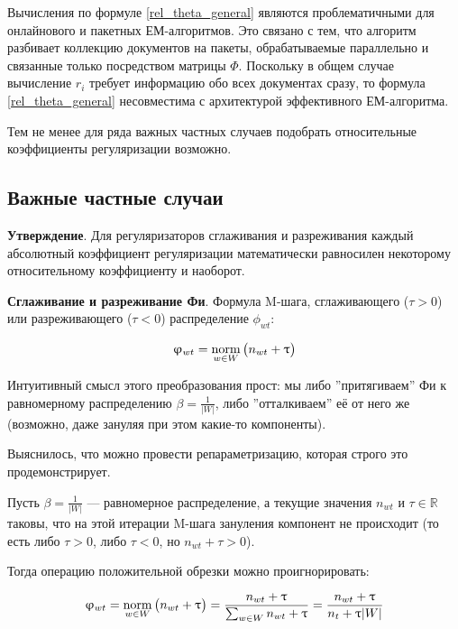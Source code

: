 Вычисления по формуле \ref{rel_theta_general} являются проблематичными для онлайнового и пакетных ЕМ-алгоритмов. Это связано с тем, что алгоритм разбивает коллекцию документов на пакеты, обрабатываемые параллельно и связанные только посредством матрицы $\Phi$. Поскольку в общем случае вычисление $r_i$ требует информацию обо всех документах сразу, то формула \ref{rel_theta_general} несовместима с архитектурой эффективного ЕМ-алгоритма.  

Тем не менее для ряда важных частных случаев подобрать относительные коэффициенты регуляризации возможно.  

\subsection{Важные частные случаи} 


\textbf{Утверждение}. Для регуляризаторов сглаживания и разреживания каждый абсолютный коэффициент регуляризации математически равносилен некоторому относительному коэффициенту и наоборот.  

\textbf{Сглаживание и разреживание Фи}. Формула M-шага, сглаживающего ($\tau > 0$) или разреживающего ($\tau < 0$) распределение $\phi_{wt}$: 

\[ 

\phi_{wt} = \norm_{w \in W} \big( n_{wt} + \tau \big) 

\] 

Интуитивный смысл этого преобразования прост: мы либо ''притягиваем'' Фи к равномерному распределению $\beta = \frac{1}{|W|}$, либо ''отталкиваем'' её от него же (возможно, даже зануляя при этом какие-то компоненты).  

Выяснилось, что можно провести репараметризацию, которая строго это продемонстрирует.  

Пусть $\beta = \frac{1}{|W|}$ --- равномерное распределение, а текущие значения $n_{wt}$ и $\tau \in \mathbb{R}$ таковы, что на этой итерации M-шага зануления компонент не происходит (то есть либо $\tau > 0$, либо $\tau < 0$, но $n_{wt} + \tau > 0$).  

Тогда операцию положительной обрезки можно проигнорировать: 

\[ 

\phi_{wt} = \norm_{w \in W} \big( n_{wt} + \tau \big) = \frac{n_{wt} + \tau }{\sum_{w \in W} n_{wt} + \tau } = \frac{n_{wt} + \tau }{n_{t} + \tau |W|}   

\] 

